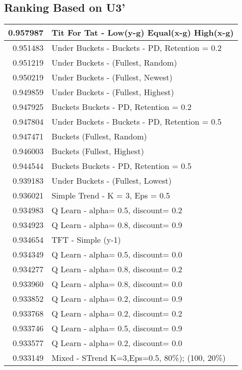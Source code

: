 \begin{table}[!hbtp]
\subsection{Ranking Based on U3'}
\begin{footnotesize}
\begin{tabular}{|r|l|}\hline  \label{U3results}
0.957987 & Tit For Tat - Low(y-g) Equal(x-g) High(x-g)\\ \hline
0.951483 & Under Buckets - Buckets - PD, Retention = 0.2\\ \hline
0.951219 & Under Buckets - (Fullest, Random)\\ \hline
0.950219 & Under Buckets - (Fullest, Newest)\\ \hline
0.949859 & Under Buckets - (Fullest, Highest)\\ \hline
0.947925 & Buckets Buckets - PD, Retention = 0.2\\ \hline
0.947804 & Under Buckets - Buckets - PD, Retention = 0.5\\ \hline
0.947471 & Buckets (Fullest, Random)\\ \hline
0.946003 & Buckets (Fullest, Highest)\\ \hline
0.944544 & Buckets Buckets - PD, Retention = 0.5\\ \hline
0.939183 & Under Buckets - (Fullest, Lowest)\\ \hline
0.936021 & Simple Trend - K = 3, Eps = 0.5\\ \hline
0.934983 & Q Learn - alpha= 0.5, discount= 0.2\\ \hline
0.934923 & Q Learn - alpha= 0.8, discount= 0.9\\ \hline
0.934654 & TFT - Simple (y-1)\\ \hline
0.934349 & Q Learn - alpha= 0.5, discount= 0.0\\ \hline
0.934277 & Q Learn - alpha= 0.8, discount= 0.2\\ \hline
0.933960 & Q Learn - alpha= 0.8, discount= 0.0\\ \hline
0.933852 & Q Learn - alpha= 0.2, discount= 0.9\\ \hline
0.933768 & Q Learn - alpha= 0.2, discount= 0.2\\ \hline
0.933746 & Q Learn - alpha= 0.5, discount= 0.9\\ \hline
0.933577 & Q Learn - alpha= 0.2, discount= 0.0\\ \hline
0.933149 & Mixed - {STrend K=3,Eps=0.5, 80\%); (100, 20\%)}\\ \hline

\end{tabular}
\end{footnotesize}
\end{table}
